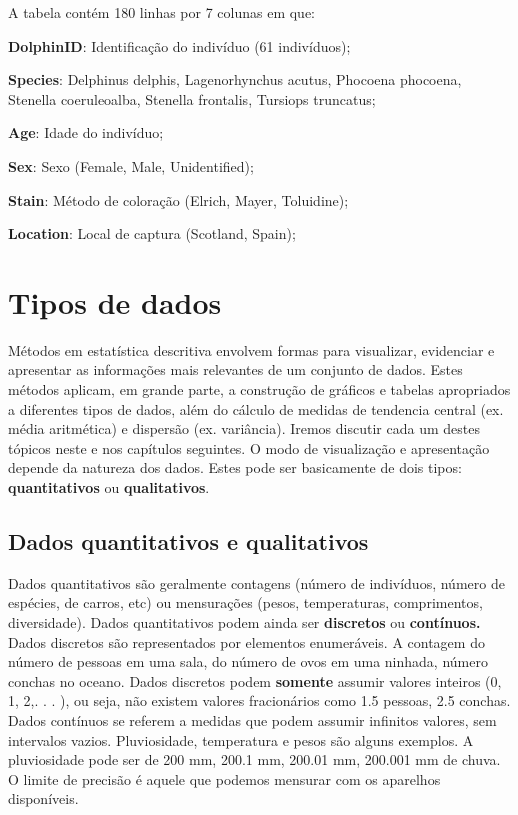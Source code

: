 \documentclass[
]{book}
\begin{document}
A tabela contém 180 linhas por 7 colunas em que:

\textbf{DolphinID}: Identificação do indivíduo (61 indivíduos);

\textbf{Species}: Delphinus delphis, Lagenorhynchus acutus, Phocoena phocoena, Stenella coeruleoalba, Stenella frontalis, Tursiops truncatus;

\textbf{Age}: Idade do indivíduo;

\textbf{Sex}: Sexo (Female, Male, Unidentified);

\textbf{Stain}: Método de coloração (Elrich, Mayer, Toluidine);

\textbf{Location}: Local de captura (Scotland, Spain);

\hypertarget{tipos-de-dados-1}{%
\section{Tipos de dados}\label{tipos-de-dados-1}}

Métodos em estatística descritiva envolvem formas para visualizar, evidenciar e apresentar as informações mais relevantes de um conjunto de dados. Estes métodos aplicam, em grande parte, a construção de gráficos e tabelas apropriados a diferentes tipos de dados, além do cálculo de medidas de tendencia central (ex. média aritmética) e dispersão (ex. variância). Iremos discutir cada um destes tópicos neste e nos capítulos seguintes. O modo de visualização e apresentação depende da natureza dos dados. Estes pode ser basicamente de dois tipos: \textbf{quantitativos} ou \textbf{qualitativos}.

\hypertarget{dados-quantitativos-e-qualitativos}{%
\subsection{Dados quantitativos e qualitativos}\label{dados-quantitativos-e-qualitativos}}

Dados quantitativos são geralmente contagens (número de indivíduos, número de espécies, de carros, etc) ou mensurações (pesos, temperaturas, comprimentos, diversidade). Dados quantitativos podem ainda ser \textbf{discretos} ou \textbf{contínuos.} Dados discretos são representados por elementos enumeráveis. A contagem do número de pessoas em uma sala, do número de ovos em uma ninhada, número conchas no oceano. Dados discretos podem \textbf{somente} assumir valores inteiros (0, 1, 2,. . . ), ou seja, não existem valores fracionários como 1.5 pessoas, 2.5 conchas. Dados contínuos se referem a medidas que podem assumir infinitos valores, sem intervalos vazios. Pluviosidade, temperatura e pesos são alguns exemplos. A pluviosidade pode ser de 200 mm, 200.1 mm, 200.01 mm, 200.001 mm de chuva. O limite de precisão é aquele que podemos mensurar com os aparelhos disponíveis.
\end{document}
